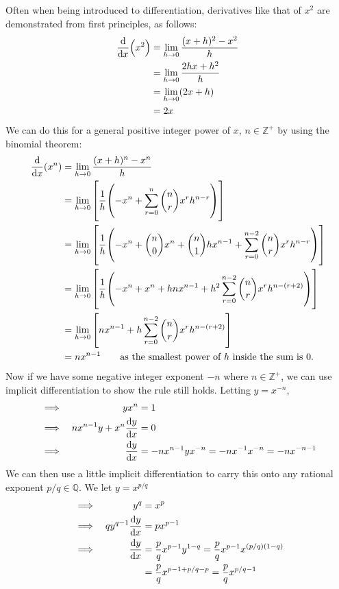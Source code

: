\documentclass[fleqn,a4paper,11pt]{article}
\newcommand{\setstyle}{\mathbb}
\newcommand{\Integers}{\setstyle Z}
\newcommand{\Rationals}{\setstyle Q}
\begin{document}
    Often when being introduced to differentiation, derivatives like that of
    \(x^2\) are demonstrated from first principles, as follows:
    \begin{align*}
    \dv{x}(x^2) &= \lim_{h \to 0} \frac{(x + h)^2 - x^2} h \\
        &= \lim_{h \to 0} \frac{2hx + h^2} h \\
        &= \lim_{h \to 0} (2x + h) \\
        &= 2x
    \end{align*}
    We can do this for a general positive integer power of \(x\),
    \(n \in \Integers^+\) by using the binomial theorem:
    \begin{align*}
    \dv{x}(x^n) &= \lim_{h \to 0} \frac{(x + h)^n - x^n} h \\
        &= \lim_{h \to 0} \bqty{\frac 1h \pqty{-x^n
                              + \sum_{r = 0}^n \binom nr x^r h^{n - r}}} \\
        &= \lim_{h \to 0} \bqty{\frac 1h \pqty{
                                -x^n + \binom n0 x^n + \binom n1 hx^{n - 1}
                              + \sum_{r = 0}^{n - 2}
                                    \binom nr x^r h^{n - r}}} \\
        &= \lim_{h \to 0} \bqty{\frac 1h \pqty{-x^n + x^n + hnx^{n - 1}
                              + h^2 \sum_{r = 0}^{n - 2}
                                    \binom nr x^r h^{n - (r + 2)}}} \\
        &= \lim_{h \to 0} \bqty{nx^{n - 1} + h \sum_{r = 0}^{n - 2}
                                    \binom nr x^r h^{n - (r + 2)}} \\
        &= nx^{n-1} \qquad
            \text{as the smallest power of \(h\) inside the sum is 0.}
    \end{align*}
    Now if we have some negative integer exponent \(-n\) where
    \(n \in \Integers^+\), we can use implicit differentiation to show the rule
    still holds. Letting \(y = x^{-n}\),
    \begin{alignat*}{2}
    &\implies& yx^n &= 1 \\
    &\implies& nx^{n - 1}y + x^n \dv{y}{x} &= 0 \\
    &\implies& \dv{y}{x} &= -nx^{n - 1}yx^{-n}
        = -nx^{-1}x^{-n} = -nx^{-n - 1}
    \end{alignat*}
    We can then use a little implicit differentiation to carry this onto any
    rational exponent \(p / q \in \Rationals\). We let \(y = x^{p / q}\)
    \begin{alignat*}{2}
    &\implies& y^q &= x^p \\
    &\implies& qy^{q - 1}\dv{y}{x} &= px^{p - 1} \\
    &\implies& \dv{y}{x} &= \frac pq x^{p - 1}y^{1 - q}
        = \frac pq x^{p - 1}x^{(p / q)(1 - q)} \\
    &&  &= \frac pq x^{p - 1 + p / q - p}
        = \frac pq x^{p / q - 1}
    \end{alignat*}
\end{document}
